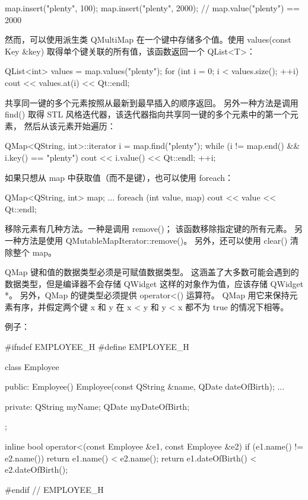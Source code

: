 \begin{cppcode}
map.insert("plenty", 100);
map.insert("plenty", 2000);
// map.value("plenty") == 2000
\end{cppcode}

然而，可以使用派生类 QMultiMap 在一个键中存储多个值。使用 values(const Key \&key) 取得单个键关联的所有值，该函数返回一个 QList<T>：

\begin{cppcode}
QList<int> values = map.values("plenty");
for (int i = 0; i < values.size(); ++i)
    cout << values.at(i) << Qt::endl;
\end{cppcode}

共享同一键的多个元素按照从最新到最早插入的顺序返回。
另外一种方法是调用 find() 取得 STL 风格迭代器，该迭代器指向共享同一键的多个元素中的第一个元素，
然后从该元素开始遍历：

\begin{cppcode}
QMap<QString, int>::iterator i = map.find("plenty");
while (i != map.end() && i.key() == "plenty") {
    cout << i.value() << Qt::endl;
    ++i;
}
\end{cppcode}

如果只想从 map 中获取值（而不是键），也可以使用 foreach：

\begin{cppcode}
QMap<QString, int> map;
...
foreach (int value, map)
    cout << value << Qt::endl;
\end{cppcode}

移除元素有几种方法。一种是调用 remove()；
该函数移除指定键的所有元素。
另一种方法是使用 QMutableMapIterator::remove()。
另外，还可以使用 clear() 清除整个 map。

QMap 键和值的数据类型必须是可赋值数据类型。
这涵盖了大多数可能会遇到的数据类型，但是编译器不会存储 QWidget 这样的对象作为值，应该存储 QWidget *。
另外，QMap 的键类型必须提供 operator<() 运算符。
QMap 用它来保持元素有序，并假定两个键 x 和 y 在 x < y 和 y < x 都不为 true 的情况下相等。

例子：

\begin{cppcode}
#ifndef EMPLOYEE_H
#define EMPLOYEE_H

class Employee
{
public:
    Employee() {}
    Employee(const QString &name, QDate dateOfBirth);
    ...

private:
    QString myName;
    QDate myDateOfBirth;
};

inline bool operator<(const Employee &e1, const Employee &e2)
{
    if (e1.name() != e2.name())
        return e1.name() < e2.name();
    return e1.dateOfBirth() < e2.dateOfBirth();
}

#endif // EMPLOYEE_H
\end{cppcode}

